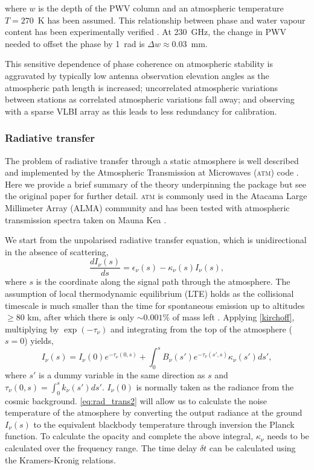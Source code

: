 \noindent where $w$ is the depth of the PWV column \citep*{Carilli_1999} and an atmospheric temperature $T=270$~K has been assumed. This relationship between phase and water vapour content has been experimentally verified \citep{hogg_1981}. At 230~GHz, the change in PWV needed to offset the phase by 1~rad is $\Delta w\approx0.03$~mm. 


This sensitive dependence of phase coherence on atmospheric stability is aggravated by typically low antenna observation elevation angles as the atmospheric path length is increased; uncorrelated atmospheric variations between stations as correlated atmospheric variations fall away; and observing with a sparse VLBI array as this leads to less redundancy for calibration.


\subsubsection{Radiative transfer}

The problem of radiative transfer through a static atmosphere is well described and implemented by the Atmospheric Transmission at Microwaves (\textsc{atm}) code \citep{Pardo_2001}. Here we provide a brief summary of the theory underpinning the package but see the original paper for further detail. \textsc{atm} is commonly used in the Atacama Large Millimeter Array (ALMA) community \citep{Curtis_2009,Nikolic_2013} and has been tested with atmospheric transmission spectra taken on Mauna Kea \citep{Serabyn_1998}.

We start from the unpolarised radiative transfer equation, which is unidirectional in the absence of scattering,
\begin{equation}\label{eq:rad_trans}
\frac{dI_\nu (s) }{ds} = \epsilon_\nu(s) -\kappa_\nu(s)  I_\nu (s),
\end{equation}
where $s$ is the coordinate along the signal path through the atmosphere.  The assumption of local thermodynamic equilibrium (LTE) holds as the collisional timescale is much smaller than the time for spontaneous emission up to altitudes $\ge 80$ km, after which there is only $\sim 0.001\%$ of mass left \citep{Pardo_2001}. Applying \ref{kirchoff}, multiplying by $\exp(-\tau_\nu)$ and integrating from the top of the atmosphere ($s=0$) yields, 
\begin{equation}\label{eq:rad_trans2}
I_\nu(s) = I_\nu(0) e^{-\tau_\nu (0,s) }+ \int_0^s B_\nu(s')e^{-\tau_\nu (s',s) }\kappa_\nu(s')ds',
\end{equation}
where  $s'$ is a dummy variable in the same direction as $s$ and $\tau_\nu (0,s) = \int_0^{s} k_\nu(s')ds'$. $I_\nu(0)$ is normally taken as the radiance from the cosmic background.
\ref{eq:rad_trans2} will allow us to calculate the noise temperature of the atmosphere by converting the output radiance at the ground $I_\nu(s)$ to  the equivalent blackbody temperature through inversion the Planck function. To calculate the opacity and complete the above integral, $\kappa_\nu$ needs to be calculated over the frequency range. The time delay $\delta t$ can be calculated using the Kramers-Kronig relations. 


